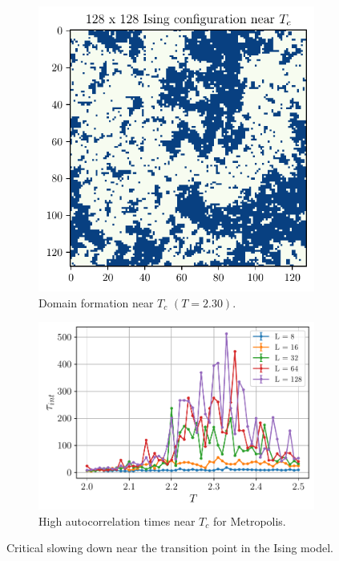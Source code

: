 \documentclass[../journal_main.tex]{subfiles}
\begin{document}
\begin{figure}[!htb]
    \centering
    \begin{subfigure}[b]{0.4\textwidth}  %
        \centering
        \includegraphics[width=\textwidth]{images/monte_carlo/ising_config_128.pdf}
        \caption{Domain formation near $T_c$ $(T=2.30)$.}
        \label{domain}
    \end{subfigure}
    \hspace{1em}  %
    \begin{subfigure}[b]{0.5\textwidth}
        \centering
        \includegraphics[width=\textwidth]{images/monte_carlo/metropolis_autocorr_time.pdf}
        \caption{High autocorrelation times near $T_c$ for Metropolis.}
        \label{autocorr_metropolis}
    \end{subfigure}
    \caption{Critical slowing down near the transition point in the Ising model.}
    \label{}
\end{figure}
\end{document}
